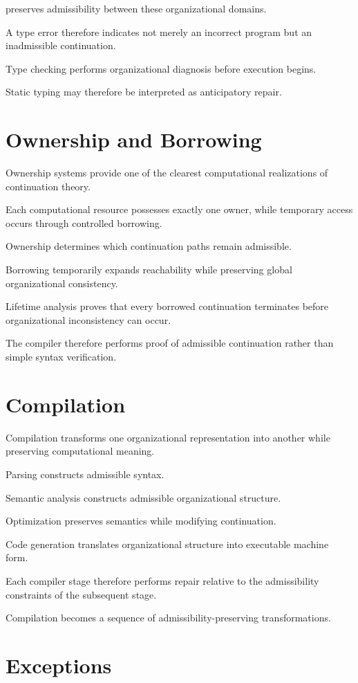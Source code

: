 \documentclass[11pt,oneside]{book}
\numberwithin{equation}{chapter}
\theoremstyle{definition}
\theoremstyle{plain}
\begin{document}
preserves admissibility between these organizational domains.

A type error therefore indicates not merely an incorrect program but an
inadmissible continuation.

Type checking performs organizational diagnosis before execution begins.

Static typing may therefore be interpreted as anticipatory repair.

\section{Ownership and Borrowing}

Ownership systems provide one of the clearest computational realizations of
continuation theory.

Each computational resource possesses exactly one owner, while temporary
access occurs through controlled borrowing.

Ownership determines which continuation paths remain admissible.

Borrowing temporarily expands reachability while preserving global
organizational consistency.

Lifetime analysis proves that every borrowed continuation terminates before
organizational inconsistency can occur.

The compiler therefore performs proof of admissible continuation rather
than simple syntax verification.

\section{Compilation}

Compilation transforms one organizational representation into another while
preserving computational meaning.

Parsing constructs admissible syntax.

Semantic analysis constructs admissible organizational structure.

Optimization preserves semantics while modifying continuation.

Code generation translates organizational structure into executable machine
form.

Each compiler stage therefore performs repair relative to the admissibility
constraints of the subsequent stage.

Compilation becomes a sequence of admissibility-preserving transformations.

\section{Exceptions}
\end{document}
